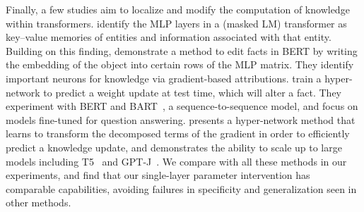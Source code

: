  




 
 
 




Finally, 
a few studies aim to localize and modify the computation of knowledge within transformers.
\citet{geva-etal-2021-transformer} identify the MLP layers in a (masked LM) transformer as key--value memories of entities and information associated with that entity. 
Building on this finding, 
\citet{dai-kn} demonstrate a method to edit facts in BERT by writing the embedding of the object into certain rows of the MLP matrix. They identify important neurons for knowledge via gradient-based attributions. 
\citet{decao-ke} train a hyper-network to predict a weight update at test time, which will alter a fact. They experiment with BERT and BART~\citep{lewis-etal-2020-bart}, a sequence-to-sequence model, and focus on models fine-tuned for question answering.
\citet{mend} presents a hyper-network method that learns to transform the decomposed terms of the gradient in order to efficiently predict a knowledge update, and demonstrates the ability to scale up to large models including T5~\citep{raffel2020exploring} and GPT-J~\citep{gpt-j}.
We compare with all these methods in our experiments, and find that our single-layer \method parameter intervention has comparable capabilities, avoiding failures in specificity and generalization seen in other methods.

